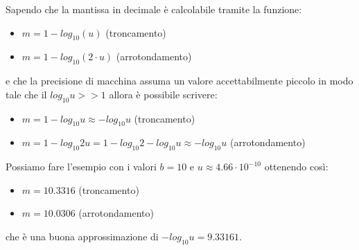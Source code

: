 Sapendo che la mantissa in decimale è calcolabile tramite la funzione:
\begin{itemize}
\item \( m = 1- log_{10}{(u)} \) (troncamento) 
\item \( m = 1- log_{10}{(2\cdot u)} \) (arrotondamento)
\end{itemize}
e che la precisione di macchina assuma un valore accettabilmente piccolo in modo tale che il \(log_{10}{u} >> 1\) allora è possibile scrivere:
\begin{itemize}
\item \( m = 1 - log_{10}{u} \approx -log_{10}{u} \) (troncamento)
\item \( m = 1 - log_{10}{2u} = 1 - log_{10}{2} - log_{10}{u} \approx -log_{10}{u} \) (arrotondamento)
\end{itemize}
Possiamo fare l'esempio con i valori $b=10$ e $u \approx 4.66 \cdot 10^{-10}$ ottenendo così:
\begin{itemize}
\item \( m = 10.3316 \) (troncamento)
\item \( m = 10.0306 \) (arrotondamento)
\end{itemize}
che è una buona approssimazione di $-log_{10}{u} = {9.33161}$.